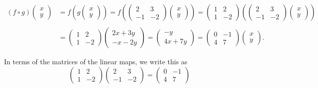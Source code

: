 \documentclass{article}
\begin{document}
\begin{align*}
(f\circ g)\begin{pmatrix} x\\ y \end{pmatrix} &=
f\left(g\begin{pmatrix} x\\ y \end{pmatrix}\right) =
f\left(\begin{pmatrix}
  2 & 3 \\
  -1 & -2
\end{pmatrix}
\begin{pmatrix}
  x \\ y
\end{pmatrix}\right)
=
\begin{pmatrix}
  1 & 2 \\
  1 & -2
\end{pmatrix}
      \left(
\begin{pmatrix}
  2 & 3 \\
  -1 & -2
\end{pmatrix}
\begin{pmatrix}
  x \\ y
\end{pmatrix}
  \right)\\
  \\
  &= 
\begin{pmatrix}
  1 & 2 \\
  1 & -2
\end{pmatrix}
\begin{pmatrix}
  2 x + 3 y\\
  -x - 2y
\end{pmatrix} =
  \begin{pmatrix}
    - y \\
    4 x + 7 y
  \end{pmatrix}
  =
  \begin{pmatrix}
    0 & -1\\
    4 & 7
  \end{pmatrix}
  \begin{pmatrix}
    x \\ y
  \end{pmatrix}.
\end{align*}

In terms of the matrices of the linear maps, we write this as
\begin{equation}\label{moperation}
\begin{pmatrix}
1 & 2\\
1 & -2
\end{pmatrix}
\begin{pmatrix}
2 & 3\\
-1 & -2
\end{pmatrix}
=
\begin{pmatrix}
0 & -1\\
4 & 7
\end{pmatrix}
\end{equation}
\end{document}
